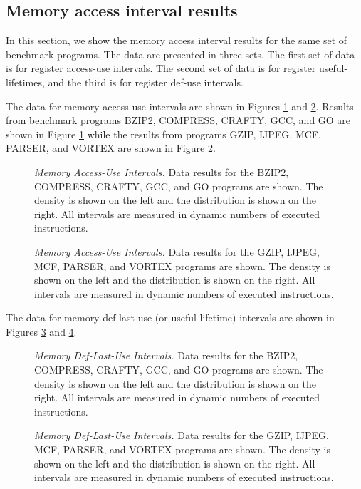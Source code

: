 \documentclass[10pt,dvips]{article}
\begin{document}
\subsection{Memory access interval results}
%
In this section, we show the memory access interval results for
the same set of benchmark programs.
The data are presented in three sets.
The first set of data is for register access-use intervals.
The second set of data is for register useful-lifetimes, and
the third is for register def-use intervals.

%
The data for memory access-use intervals are
shown in Figures \ref{fig:aa_mrint} 
and \ref{fig:ab_mrint}.
Results from benchmark programs BZIP2, COMPRESS, CRAFTY, GCC, and GO
are shown in Figure \ref{fig:aa_mrint} while the results
from programs GZIP, IJPEG, MCF, PARSER, and VORTEX are shown in
Figure \ref{fig:ab_mrint}.
%
\begin{figure}
\centering
{}
\caption{{\em Memory Access-Use Intervals.} 
\small{
Data results for the 
BZIP2, COMPRESS, CRAFTY, GCC, and GO programs are shown.
The density is shown on the left and the distribution is shown
on the right.
All intervals are measured in dynamic numbers of executed instructions.}
}
\label{fig:aa_mrint}
\end{figure}
%
\begin{figure}
\centering
{}
\caption{{\em Memory Access-Use Intervals.} 
\small{
Data results for the
GZIP, IJPEG, MCF, PARSER, and VORTEX programs are shown.
The density is shown on the left and the distribution is shown
on the right.
All intervals are measured in dynamic numbers of executed instructions.}
}
\label{fig:ab_mrint}
\end{figure}
%
%
%
The data for memory def-last-use (or useful-lifetime) intervals are
shown in Figures \ref{fig:aa_mlife} 
and \ref{fig:ab_mlife}.
%
\begin{figure}
\centering
{}
\caption{{\em Memory Def-Last-Use Intervals.} 
\small{
Data results for the 
BZIP2, COMPRESS, CRAFTY, GCC, and GO programs are shown.
The density is shown on the left and the distribution is shown
on the right.
All intervals are measured in dynamic numbers of executed instructions.}
}
\label{fig:aa_mlife}
\end{figure}
%
\begin{figure}
\centering
{}
\caption{{\em Memory Def-Last-Use Intervals.} 
\small{
Data results for the
GZIP, IJPEG, MCF, PARSER, and VORTEX programs are shown.
The density is shown on the left and the distribution is shown
on the right.
All intervals are measured in dynamic numbers of executed instructions.}
}
\label{fig:ab_mlife}
\end{figure}
\end{document}
